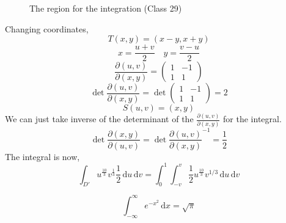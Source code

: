 \documentclass[letter]{article}
\renewcommand{\d}{\,\mathrm{d}}
\begin{document}
\begin{figure}[ht]
    \centering
    \caption{The region for the integration (Class 29)}
    \label{fig:the-region-for-the-integration-(class-29)}
\end{figure}
Changing coordinates, 
\[
T(x,y) = (x-y, x+y)
\]
\[
x = \frac{u+v}{2} \quad y = \frac{v - u}{2}
\]
\[
\frac{
\partial 
\left( u, v\right)
}{\partial
\left(x , y\right)}  = 
\begin{pmatrix} 1 & -1 \\ 1 & 1 \end{pmatrix} 
\] 
\[ 
\det 	\frac{
\partial 
\left( u, v\right)
}{\partial
\left(x , y\right)}  = 
\det \begin{pmatrix} 1 & -1 \\ 1 & 1 \end{pmatrix}  = 2
\] 
\[
S (u , v) = (x,y)
\] 
We can just take inverse of the determinant of the $\frac{\partial (u,v)}{\partial (x,y)}$ for the integral.
\[
\det 
\frac{\partial (x,y)}{\partial (u,v)} = \det \frac{\partial (u,v)}{\partial (x,y)}^{-1}= \frac{1}{2}
\] 
The integral is now,
\[
	\int_{D'} u^{\frac{10}{3}} v^{\frac{1}{3}} \frac{1}{2} \d u \d v
= \int_{0}^{1} \int_{-v}^{v} \frac{1}{2} u^{\frac{10}{3}} v^{1 / 3} \d u \d v  
\]

\[
\int_{-\infty}^{\infty} e^{-x ^2 } \d x = \sqrt{ \pi }  
\] 
\end{document}
